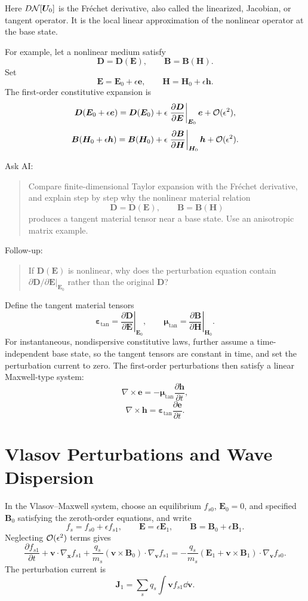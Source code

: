 Here \(D\mathcal N[\bm U_0]\) is the Fr\'echet derivative, also called the linearized, Jacobian, or tangent operator. It is the local linear approximation of the nonlinear operator at the base state.

For example, let a nonlinear medium satisfy
\[
\bm D=\bm D(\bm E),
\qquad
\bm B=\bm B(\bm H).
\]
Set
\[
\bm E=\bm E_0+\epsilon\bm e,
\qquad
\bm H=\bm H_0+\epsilon\bm h.
\]
The first-order constitutive expansion is
\[
\bm D(\bm E_0+\epsilon\bm e)
=
\bm D(\bm E_0)
+
\epsilon
\left.
\frac{\partial\bm D}{\partial\bm E}
\right|_{\bm E_0}\bm e
+\mathcal O(\epsilon^2),
\]
\[
\bm B(\bm H_0+\epsilon\bm h)
=
\bm B(\bm H_0)
+
\epsilon
\left.
\frac{\partial\bm B}{\partial\bm H}
\right|_{\bm H_0}\bm h
+\mathcal O(\epsilon^2).
\]

\begin{askai}
Ask AI:
\begin{quote}
Compare finite-dimensional Taylor expansion with the Fr\'echet derivative, and explain step by step why the nonlinear material relation
\[
\bm D=\bm D(\bm E),\qquad \bm B=\bm B(\bm H)
\]
produces a tangent material tensor near a base state. Use an anisotropic matrix example.
\end{quote}

Follow-up:
\begin{quote}
If \(\bm D(\bm E)\) is nonlinear, why does the perturbation equation contain \(\partial\bm D/\partial\bm E|_{\bm E_0}\) rather than the original \(\bm D\)?
\end{quote}
\end{askai}

Define the tangent material tensors
\[
\bm\varepsilon_{\mathrm{tan}}
=
\left.\frac{\partial\bm D}{\partial\bm E}\right|_{\bm E_0},
\qquad
\bm\mu_{\mathrm{tan}}
=
\left.\frac{\partial\bm B}{\partial\bm H}\right|_{\bm H_0}.
\]
For instantaneous, nondispersive constitutive laws, further assume a time-independent base state, so the tangent tensors are constant in time, and set the perturbation current to zero. The first-order perturbations then satisfy a linear Maxwell-type system:
\[
\nabla\times\bm e
=
-\bm\mu_{\mathrm{tan}}\frac{\partial\bm h}{\partial t},
\]
\[
\nabla\times\bm h
=
\bm\varepsilon_{\mathrm{tan}}\frac{\partial\bm e}{\partial t}.
\]

\section{Vlasov Perturbations and Wave Dispersion}
In the Vlasov--Maxwell system, choose an equilibrium $f_{s0}$, $\bm E_0=0$, and specified $\bm B_0$ satisfying the zeroth-order equations, and write
\[
f_s=f_{s0}+\epsilon f_{s1},
\qquad
\bm E=\epsilon\bm E_1,
\qquad
\bm B=\bm B_0+\epsilon\bm B_1.
\]
Neglecting \(\mathcal O(\epsilon^2)\) terms gives
\[
\frac{\partial f_{s1}}{\partial t}
+\bm v\cdot\nabla_{\bm x}f_{s1}
+\frac{q_s}{m_s}
(\bm v\times\bm B_0)\cdot\nabla_{\bm v}f_{s1}
=
-\frac{q_s}{m_s}
(\bm E_1+\bm v\times\bm B_1)
\cdot\nabla_{\bm v}f_{s0}.
\]
The perturbation current is
\[
\bm J_1=\sum_s q_s\int \bm v f_{s1}\dd\bm v.
\]

